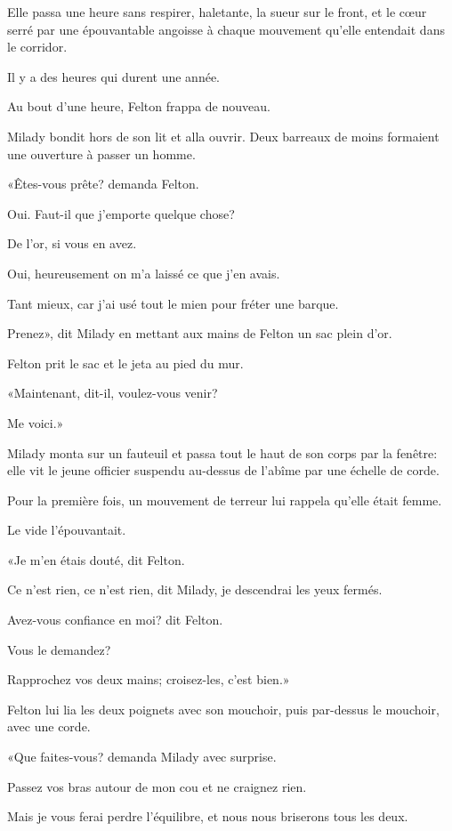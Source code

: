 Elle passa une heure sans respirer, haletante, la sueur sur le front, et le cœur serré par une épouvantable angoisse à chaque mouvement qu'elle entendait dans le corridor. 

Il y a des heures qui durent une année. 

Au bout d'une heure, Felton frappa de nouveau. 

Milady bondit hors de son lit et alla ouvrir. Deux barreaux de moins formaient une ouverture à passer un homme. 

«Êtes-vous prête? demanda Felton. 

\speak  Oui. Faut-il que j'emporte quelque chose? 

\speak  De l'or, si vous en avez. 

\speak  Oui, heureusement on m'a laissé ce que j'en avais. 

\speak  Tant mieux, car j'ai usé tout le mien pour fréter une barque. 

\speak  Prenez», dit Milady en mettant aux mains de Felton un sac plein d'or. 

Felton prit le sac et le jeta au pied du mur. 

«Maintenant, dit-il, voulez-vous venir? 

\speak  Me voici.» 

Milady monta sur un fauteuil et passa tout le haut de son corps par la fenêtre: elle vit le jeune officier suspendu au-dessus de l'abîme par une échelle de corde. 

Pour la première fois, un mouvement de terreur lui rappela qu'elle était femme. 

Le vide l'épouvantait. 

«Je m'en étais douté, dit Felton. 

\speak  Ce n'est rien, ce n'est rien, dit Milady, je descendrai les yeux fermés. 

\speak  Avez-vous confiance en moi? dit Felton. 

\speak  Vous le demandez? 

\speak  Rapprochez vos deux mains; croisez-les, c'est bien.» 

Felton lui lia les deux poignets avec son mouchoir, puis par-dessus le mouchoir, avec une corde. 

«Que faites-vous? demanda Milady avec surprise. 

\speak  Passez vos bras autour de mon cou et ne craignez rien. 

\speak  Mais je vous ferai perdre l'équilibre, et nous nous briserons tous les deux. 

